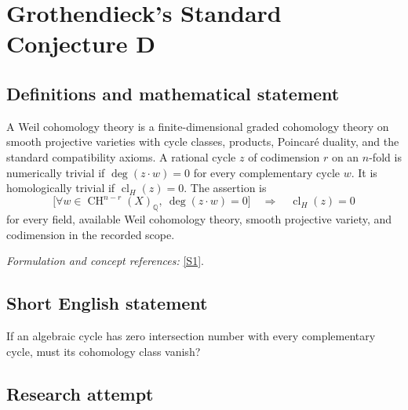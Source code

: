 \documentclass[11pt,a4paper]{article}
\newcommand{\Q}{\mathbb{Q}}
\newcommand{\sref}[2]{\hyperlink{source:#1:#2}{[S#2]}}
\newif\ifshowcatalogue
\newcommand{\cataloguescope}[1]{\ifshowcatalogue
 \paragraph{Exact scope in the supplied catalogue.}
 \begin{quote}\small #1\end{quote}\fi}
\numberwithin{equation}{section}
\begin{document}
\setcounter{section}{0}
\clearpage
\section*{\texorpdfstring{Grothendieck's Standard Conjecture D}{Grothendieck's Standard Conjecture D}}\label{30006693}
\subsection{Definitions and mathematical statement}
A Weil cohomology theory is a finite-dimensional graded cohomology theory on smooth projective varieties with cycle classes, products, Poincaré duality, and the standard compatibility axioms. A rational cycle $z$ of codimension $r$ on an $n$-fold is numerically trivial if $\deg(z\cdot w)=0$ for every complementary cycle $w$. It is homologically trivial if $\operatorname{cl}_H(z)=0$. The assertion is
\[
 \bigl[\forall w\in\operatorname{CH}^{n-r}(X)_{\Q},\ \deg(z\cdot w)=0\bigr]
 \quad\Longrightarrow\quad \operatorname{cl}_H(z)=0
\]
for every field, available Weil cohomology theory, smooth projective variety, and codimension in the recorded scope.
\par\smallskip\textit{Formulation and concept references:} \sref{30006693}{1}.
\cataloguescope{For every field k, every Weil cohomology theory H* available over k, every smooth projective k-variety X of pure dimension n, every integer r with 0<=r<=n, and every rational algebraic cycle z of codimension r on X, if deg(z.w)=0 for every rational algebraic cycle w of codimension n-r on X, then the H* cycle class of z is zero. Equivalently, numerical and H*-homological equivalence of rational algebraic cycles agree in every codimension.}
\subsection{Short English statement}
If an algebraic cycle has zero intersection number with every complementary cycle, must its cohomology class vanish?
\subsection{Research attempt}
\end{document}
